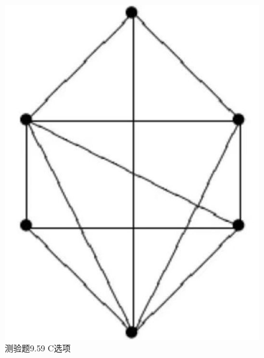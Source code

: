 \documentclass[UTF8, heading=true]{ctexart}
\begin{document}
\begin{figure}[H]
  \centering
  \begin{minipage}[t]{0.26\textwidth}
      \centering
      \includegraphics[width=1\textwidth]{9.59_3.jpg} %
      \vspace{-0.3cm}
      \caption{测验题9.59 C选项}
  \end{minipage}
  \hspace{0.2\textwidth} %
  \begin{minipage}[t]{0.26\textwidth}
      \centering

\end{minipage}
\end{figure}
\end{document}
